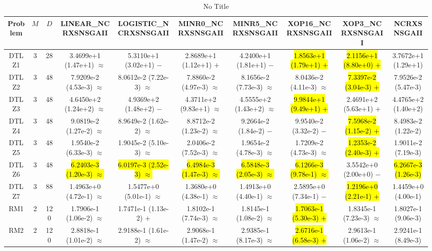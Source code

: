 \documentclass[journal]{IEEEtran}
\begin{document}
\begin{table*}[htbp]
\renewcommand{\arraystretch}{1.2}
\centering
\caption{No Title}
\begin{tabular}{cccccccccc}
\toprule
Problem&$M$&$D$&LINEAR\_NCRXSNSGAII&LOGISTIC\_NCRXSNSGAII&MINR0\_NCRXSNSGAII&MINR5\_NCRXSNSGAII&XOP16\_NCRXSNSGAII&XOP3\_NCRXSNSGAII&NCRXSNSGAII\\
\midrule
\multirow{1}{*}{DTLZ1}&3&28&3.4699e+1 (1.47e+1) $\approx$&5.3110e+1 (3.02e+1) $-$&2.8689e+1 (1.12e+1) $+$&4.2400e+1 (1.81e+1) $-$&\hl{1.8563e+1 (1.79e+1) $+$}&\hl{2.1156e+1 (8.80e+0) $+$}&3.7672e+1 (1.29e+1)\\
\hline
\multirow{1}{*}{DTLZ2}&3&48&7.9209e-2 (4.53e-3) $\approx$&8.0612e-2 (7.22e-3) $\approx$&7.8860e-2 (4.97e-3) $\approx$&8.1656e-2 (7.73e-3) $\approx$&8.0436e-2 (4.11e-3) $\approx$&\hl{7.3397e-2 (3.04e-3) $+$}&7.9526e-2 (5.47e-3)\\
\hline
\multirow{1}{*}{DTLZ3}&3&48&4.6450e+2 (1.24e+2) $\approx$&4.9369e+2 (1.48e+2) $-$&4.3711e+2 (9.83e+1) $\approx$&4.5555e+2 (1.43e+2) $\approx$&\hl{9.9844e+1 (9.49e+1) $+$}&2.4691e+2 (5.63e+1) $+$&4.4765e+2 (1.40e+2)\\
\hline
\multirow{1}{*}{DTLZ4}&3&48&9.0819e-2 (1.27e-2) $\approx$&8.9649e-2 (1.62e-2) $\approx$&8.8712e-2 (1.23e-2) $\approx$&9.2664e-2 (1.84e-2) $-$&9.9540e-2 (3.32e-2) $-$&\hl{7.5968e-2 (1.15e-2) $+$}&8.4983e-2 (1.22e-2)\\
\hline
\multirow{1}{*}{DTLZ5}&3&48&1.9540e-2 (6.33e-3) $\approx$&1.9045e-2 (5.10e-3) $\approx$&2.0406e-2 (7.52e-3) $\approx$&1.9654e-2 (4.78e-3) $\approx$&1.7209e-2 (4.73e-3) $\approx$&\hl{1.2353e-2 (2.40e-3) $+$}&1.9011e-2 (7.19e-3)\\
\hline
\multirow{1}{*}{DTLZ6}&3&48&\hl{6.2403e-3 (1.20e-3) $\approx$}&\hl{6.0197e-3 (2.52e-3) $\approx$}&\hl{6.4984e-3 (1.47e-3) $\approx$}&\hl{6.5848e-3 (2.05e-3) $\approx$}&\hl{6.1266e-3 (9.78e-1) $\approx$}&3.5542e+0 (2.00e+0) $-$&\hl{6.2667e-3 (1.26e-3)}\\
\hline
\multirow{1}{*}{DTLZ7}&3&88&1.4963e+0 (4.72e-1) $\approx$&1.5477e+0 (5.01e-1) $\approx$&1.3680e+0 (4.38e-1) $\approx$&1.4913e+0 (4.40e-1) $\approx$&2.5895e+0 (7.34e-1) $-$&\hl{1.2196e+0 (2.21e-1) $+$}&1.4459e+0 (4.00e-1)\\
\hline
\multirow{1}{*}{RM1}&2&120&1.7906e-1 (1.06e-2) $\approx$&1.7471e-1 (1.13e-2) $+$&1.8102e-1 (7.74e-3) $\approx$&1.8145e-1 (1.08e-2) $\approx$&\hl{1.7063e-1 (5.30e-3) $+$}&1.8345e-1 (7.23e-3) $\approx$&1.8027e-1 (9.06e-3)\\
\hline
\multirow{1}{*}{RM2}&2&120&2.8818e-1 (1.01e-2) $\approx$&2.9188e-1 (1.61e-2) $\approx$&2.9068e-1 (1.47e-2) $\approx$&2.9385e-1 (8.17e-3) $\approx$&\hl{2.6716e-1 (6.58e-3) $+$}&2.9613e-1 (1.06e-2) $\approx$&2.9241e-1 (8.49e-3)\\

\end{tabular}
\end{table*}
\end{document}
